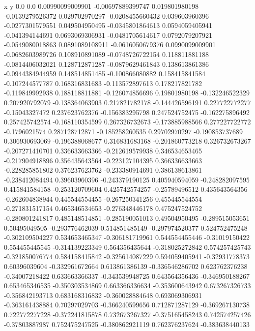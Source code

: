               x                y
            0.0              0.0
0.00990099009901  -0.00697889399747
 0.019801980198  -0.0139279526372
 0.029702970297  -0.0208455660432
 0.039603960396  -0.0277301579551
 0.049504950495  -0.0345801864613
0.0594059405941  -0.041394144691
0.0693069306931  -0.0481705614617
0.0792079207921  -0.0549080018863
0.0891089108911  -0.0616050679376
0.0990099009901  -0.0682603989726
 0.108910891089  -0.0748726722154
 0.118811881188  -0.0814406032021
 0.128712871287  -0.0879629461843
 0.138613861386  -0.0944384944959
 0.148514851485  -0.100866080882
 0.158415841584  -0.107244577787
 0.168316831683  -0.113572897613
 0.178217821782  -0.119849992938
 0.188118811881  -0.126074856696
  0.19801980198  -0.132246522329
 0.207920792079  -0.138364063903
 0.217821782178  -0.144426596191
 0.227722772277   -0.15043327472
 0.237623762376  -0.156383295798
 0.247524752475  -0.162275896492
 0.257425742574  -0.168110354599
 0.267326732673  -0.173885988566
 0.277227722772    -0.1796021574
 0.287128712871  -0.185258260535
  0.29702970297  -0.190853737689
 0.306930693069  -0.196388068677
 0.316831683168  -0.201860773218
 0.326732673267  -0.207271410701
 0.336633663366  -0.212619579938
 0.346534653465  -0.217904918896
 0.356435643564  -0.223127104395
 0.366336633663  -0.228285851802
 0.376237623762  -0.233380914691
 0.386138613861  -0.238412084494
  0.39603960396  -0.243379190125
 0.405940594059  -0.248282097595
 0.415841584158  -0.253120709604
 0.425742574257   -0.25789496512
 0.435643564356  -0.262604838944
 0.445544554455  -0.267250341256
 0.455445544554  -0.271831517154
 0.465346534653  -0.276348446178
 0.475247524752  -0.280801241817
 0.485148514851  -0.285190051013
  0.49504950495  -0.289515053651
  0.50495049505  -0.293776462039
 0.514851485149  -0.297974520377
 0.524752475248  -0.302109504227
 0.534653465347  -0.306181719961
 0.544554455446   -0.31019150422
 0.554455445545  -0.314139223349
 0.564356435644  -0.318025272842
 0.574257425743  -0.321850076774
 0.584158415842  -0.325614087229
 0.594059405941   -0.32931778373
  0.60396039604  -0.332961672664
 0.613861386139  -0.336546286702
 0.623762376238   -0.34007218422
 0.633663366337  -0.343539948725
 0.643564356436  -0.346950188267
 0.653465346535  -0.350303534869
 0.663366336634  -0.353600643942
 0.673267326733  -0.356842193713
 0.683168316832  -0.360028884648
 0.693069306931  -0.363161438884
  0.70297029703  -0.366240599656
 0.712871287129  -0.369267130738
 0.722772277228  -0.372241815878
 0.732673267327  -0.375165458243
 0.742574257426   -0.37803887987
 0.752475247525  -0.380862921119
 0.762376237624  -0.383638440133
